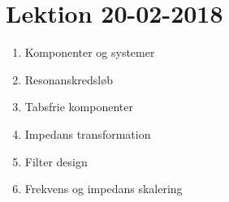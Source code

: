 \section{Lektion 20-02-2018}

\begin{enumerate}
	\item Komponenter og systemer
	\item Resonanskredsløb
	\item Tabsfrie komponenter
	\item Impedans transformation
	\item Filter design
	\item Frekvens og impedans skalering
\end{enumerate}

\noindent{} \vspace{3mm}

